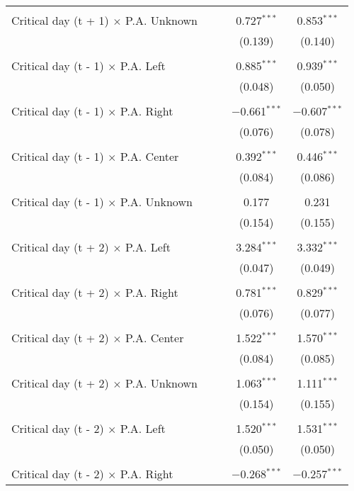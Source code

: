 \documentclass[
]{article}
\begin{document}
\begin{table}[!htbp]
{\begin{tabular}{@{\extracolsep{5pt}}lcccc}
  & & & & \\ 
 Critical day (t + 1) $\times$ P.A. Unknown &  &  & 0.727$^{***}$ & 0.853$^{***}$ \\ 
  &  &  & (0.139) & (0.140) \\ 
  & & & & \\ 
 Critical day (t - 1) $\times$ P.A. Left &  &  & 0.885$^{***}$ & 0.939$^{***}$ \\ 
  &  &  & (0.048) & (0.050) \\ 
  & & & & \\ 
 Critical day (t - 1) $\times$ P.A. Right &  &  & $-$0.661$^{***}$ & $-$0.607$^{***}$ \\ 
  &  &  & (0.076) & (0.078) \\ 
  & & & & \\ 
 Critical day (t - 1) $\times$ P.A. Center &  &  & 0.392$^{***}$ & 0.446$^{***}$ \\ 
  &  &  & (0.084) & (0.086) \\ 
  & & & & \\ 
 Critical day (t - 1) $\times$ P.A. Unknown &  &  & 0.177 & 0.231 \\ 
  &  &  & (0.154) & (0.155) \\ 
  & & & & \\ 
 Critical day (t + 2) $\times$ P.A. Left &  &  & 3.284$^{***}$ & 3.332$^{***}$ \\ 
  &  &  & (0.047) & (0.049) \\ 
  & & & & \\ 
 Critical day (t + 2) $\times$ P.A. Right &  &  & 0.781$^{***}$ & 0.829$^{***}$ \\ 
  &  &  & (0.076) & (0.077) \\ 
  & & & & \\ 
 Critical day (t + 2) $\times$ P.A. Center &  &  & 1.522$^{***}$ & 1.570$^{***}$ \\ 
  &  &  & (0.084) & (0.085) \\ 
  & & & & \\ 
 Critical day (t + 2) $\times$ P.A. Unknown &  &  & 1.063$^{***}$ & 1.111$^{***}$ \\ 
  &  &  & (0.154) & (0.155) \\ 
  & & & & \\ 
 Critical day (t - 2) $\times$ P.A. Left &  &  & 1.520$^{***}$ & 1.531$^{***}$ \\ 
  &  &  & (0.050) & (0.050) \\ 
  & & & & \\ 
 Critical day (t - 2) $\times$ P.A. Right &  &  & $-$0.268$^{***}$ & $-$0.257$^{***}$ \\ 

\end{tabular}}
\end{table}
\end{document}
